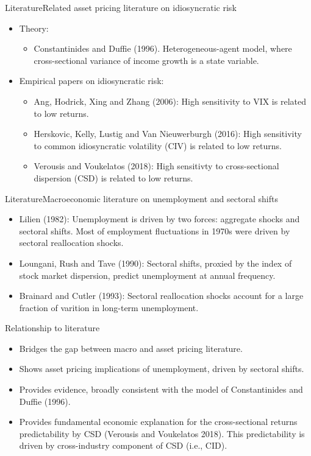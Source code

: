 \documentclass{beamer}
\begin{document}
\begin{frame}{Literature}{Related asset pricing literature on idiosyncratic risk}
\begin{itemize}
    \item {Theory:}
    \begin{itemize}
        \item {Constantinides and Duffie (1996). Heterogeneous-agent model, where cross-sectional variance of income growth is a state variable.}
    \end{itemize}
    \item {Empirical papers on idiosyncratic risk:}
    \begin{itemize}
        \item {Ang, Hodrick, Xing and Zhang (2006): High sensitivity to VIX is related to low returns.}
        \item {Herskovic, Kelly, Lustig and Van Nieuwerburgh (2016): High sensitivity to common idiosyncratic volatility (CIV) is related to low returns.}
        \item {Verousis and Voukelatos (2018): High sensitivty to cross-sectional dispersion (CSD) is related to low returns.}
    \end{itemize}
\end{itemize}
\end{frame}



\begin{frame}{Literature}{Macroeconomic literature on unemployment and sectoral shifts}
\begin{itemize}
    \item {Lilien (1982): Unemployment is driven by two forces: aggregate shocks and sectoral shifts. Most of employment fluctuations in 1970s were driven by sectoral reallocation shocks.}
    \item {Loungani, Rush and Tave (1990): Sectoral shifts, proxied by the index of stock market dispersion, predict unemployment at annual frequency.}
    \item {Brainard and Cutler (1993): Sectoral reallocation shocks account for a large fraction of varition in long-term unemployment.}
\end{itemize}
\end{frame}



\begin{frame}{Relationship to literature}
\begin{itemize}
    \item {Bridges the gap between macro and asset pricing literature.}
    \item {Shows asset pricing implications of unemployment, driven by sectoral shifts.}
    \item {Provides evidence, broadly consistent with the model of Constantinides and Duffie (1996).}
    \item {Provides fundamental economic explanation for the cross-sectional returns predictability by CSD (Verousis and Voukelatos 2018). This predictability is driven by cross-industry component of CSD (i.e., CID).}
\end{itemize}
\end{frame}
\end{document}
